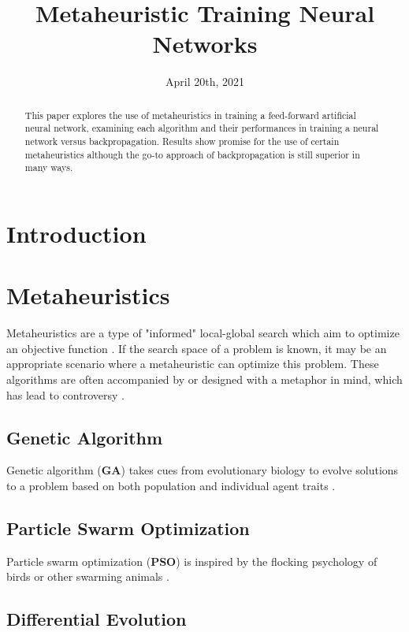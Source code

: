\documentclass[a4paper,12pt]{article}
\title{Metaheuristic Training Neural Networks}
\date{April 20th, 2021}
\begin{document}
\maketitle

\begin{abstract}
This paper explores the use of metaheuristics in training a feed-forward artificial neural network, examining each algorithm and their performances in training a neural network versus backpropagation. Results show promise for the use of certain metaheuristics although the go-to approach of backpropagation is still superior in many ways.
\end{abstract}

\section{Introduction}



\section{Metaheuristics}

Metaheuristics are a type of "informed" local-global search which aim to optimize an objective function \cite{mh}. If the search space of a problem is known, it may be an appropriate scenario where a metaheuristic can optimize this problem. These algorithms are often accompanied by or designed with a metaphor in mind, which has lead to controversy \cite{crit}.



\subsection{Genetic Algorithm}

Genetic algorithm (\textbf{GA}) takes cues from evolutionary biology to evolve solutions to a problem based on both population and individual agent traits \cite{ga}.

\subsection{Particle Swarm Optimization}

Particle swarm optimization (\textbf{PSO}) is inspired by the flocking psychology of birds or other swarming animals \cite{pso}. 

\subsection{Differential Evolution}
\end{document}

